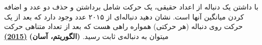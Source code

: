 با داشتن یک دنباله از اعداد حقیقی، یک حرکت شامل برداشتن و حذف دو عدد و اضافه کردن میانگین آنها است.
نشان دهید دنباله‌ای از ۲۰۱۵ عدد وجود دارد که بعد از یک حرکت روی دنباله (هر حرکتی) همواره راهی هست که بعد از تعداد متناهی حرکت میتوان به دنباله‌ی ثابت رسید.
\textbf{(الگوریتم، آسان)}
\href{https://artofproblemsolving.com/community/c5h1083099p4769963}{\textbf{(2015)}}